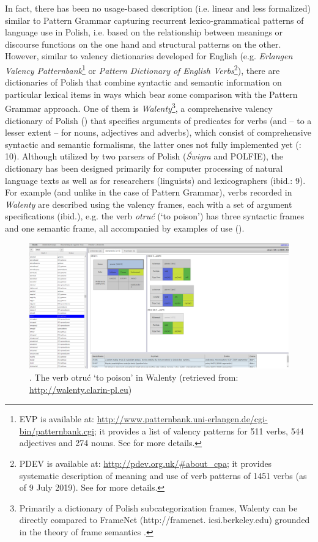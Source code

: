 \documentclass[output=paper]{langscibook}
\begin{document}
In fact, there has been no usage-based description (i.e. linear and less formalized) similar to Pattern Grammar capturing recurrent lexico-grammatical patterns of language use in Polish, i.e. based on the relationship between meanings or discourse functions on the one hand and structural patterns on the other. However, similar to valency dictionaries developed for English (e.g. \textit{Erlangen Valency Patternbank}\footnote{EVP is available at: \url{http://www.patternbank.uni-erlangen.de/cgi-bin/patternbank.cgi}; it provides a list of valency patterns for 511 verbs, 544 adjectives and 274 nouns. See \citet{HerbstEtAl2004} for more details.} or \textit{Pattern Dictionary of English Verbs}\footnote{PDEV is available at: \url{http://pdev.org.uk/\#about_cpa}; it provides systematic description of meaning and use of verb patterns of 1451 verbs (as of 9 July 2019). See \citet{Hanks2013} for more details.}), there are dictionaries of Polish that combine syntactic and semantic information on particular lexical items in ways which bear some comparison with the Pattern Grammar approach. One of them is \textit{Walenty}\footnote{Primarily a dictionary of Polish subcategorization frames, Walenty can be directly compared to FrameNet (http://framenet. icsi.berkeley.edu) grounded in the theory of frame semantics \citep{Fillmore1982}.}, a comprehensive valency dictionary of Polish (\citealt{PrzepiórkowskiEtAl2017Phraseology,PrzepiórkowskiEtAl2017Walenty}) that specifies arguments of predicates for verbs (and -- to a lesser extent -- for nouns, adjectives and adverbs), which consist of comprehensive syntactic and semantic formalisms, the latter ones not fully implemented yet (\citealt{PrzepiórkowskiEtAl2017Phraseology}: 10). Although utilized by two parsers of Polish (\textit{Świgra} and POLFIE), the dictionary has been designed primarily for computer processing of natural language texts as well as for researchers (linguists) and lexicographers (ibid.: 9). For example (and unlike in the case of Pattern Grammar), verbs recorded in \textit{Walenty} are described using the valency frames, each with a set of argument specifications (ibid.), e.g. the verb \textit{otruć} (‘to poison’) has three syntactic frames and one semantic frame, all accompanied by examples of use ().

   
\begin{figure}
\includegraphics[width=\textwidth]{figures/grabowski-img001.png}
\caption{\label{fig:grabowski:1}. The verb otruć ‘to poison’ in Walenty (retrieved from: \url{http://walenty.clarin-pl.eu})}
\end{figure}
\end{document}
